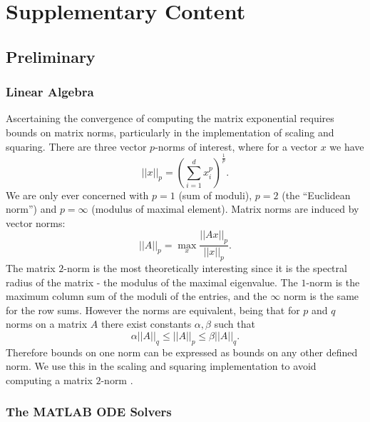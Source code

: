 \appendix

\chapter{Supplementary Content}

\section{Preliminary}

\subsection{Linear Algebra}

Ascertaining the convergence of computing the matrix exponential requires bounds on matrix norms, particularly in the implementation of scaling and squaring.
There are three vector $p$-norms of interest, where for a vector $x$ we have
\begin{equation*}
    ||x||_p = \left( \sum_{i=1}^{d} x_i^p  \right)^{\frac{1}{p}}.
\end{equation*}
We are only ever concerned with $p=1$ (sum of moduli), $p=2$ (the ``Euclidean norm'') and $p=\infty$ (modulus of maximal element).
Matrix norms are induced by vector norms:
\begin{equation*}
    ||A||_p = \max_x \frac{||Ax||_p}{||x||_p}.
\end{equation*}
The matrix $2$-norm is the most theoretically interesting since it is the spectral radius of the matrix - the modulus of the maximal eigenvalue.
The $1$-norm is the maximum column sum of the moduli of the entries, and the $\infty$ norm is the same for the row sums.
However the norms are equivalent, being that for $p$ and $q$ norms on a matrix $A$ there exist constants $\alpha, \beta$ such that
\begin{equation*}
    \alpha ||A||_q \leq ||A||_p \leq \beta ||A||_q.
\end{equation*}  
Therefore bounds on one norm can be expressed as bounds on any other defined norm.
We use this in the scaling and squaring implementation to avoid computing a matrix $2$-norm \cite{higham2005scaling}.

\subsection{The MATLAB ODE Solvers}

